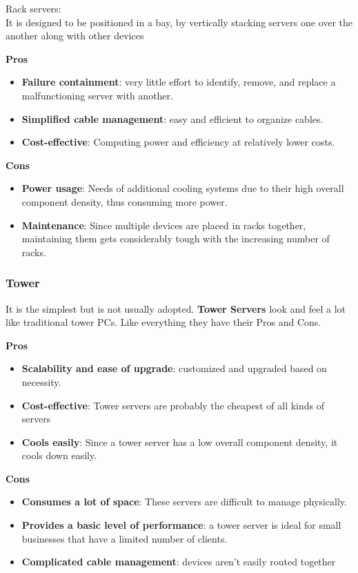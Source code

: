 \documentclass[10pt, oneside]{article}
\begin{document}
Rack servers:\\
It is designed to be positioned in a bay, by vertically stacking servers one over the another along with other devices
\begin{multicols}{2}
\noindent
{\bf \color{green}Pros}\color{black}
\begin{itemize}
    \item {\bf Failure containment}: very little effort to identify, remove, and replace a malfunctioning server with another.
    \item {\bf Simplified cable management}: easy
and efficient to organize cables.
    \item {\bf Cost-effective}: Computing power and efficiency at relatively lower costs.
\end{itemize}
\columnbreak
\noindent
{\bf \color{red}Cons}\color{black}
\begin{itemize}
    \item {\bf Power usage}: Needs of additional cooling systems due to their high overall component density, thus consuming more power.
    \item {\bf Maintenance}: Since multiple devices are placed in racks together, maintaining them gets considerably tough with the increasing number of racks.
\end{itemize}
\end{multicols}
\newpage
\subsubsection{Tower}
It is the simplest but is not usually adopted.
\textbf{Tower Servers}
look and feel a lot like traditional tower PCs.
Like everything they have their Pros and Cons.
\begin{multicols}{2}
\noindent
{\bf \color{green}Pros}\color{black}
\begin{itemize}
    \item {\bf Scalability and ease of upgrade}: customized and upgraded based on necessity.
    \item {\bf Cost-effective}: Tower servers are probably the cheapest of all kinds of servers
    \item {\bf Cools easily}: Since a tower server has a low overall component density, it cools down easily.
\end{itemize}
\columnbreak
\noindent
{\bf \color{red}Cons}\color{black}
\begin{itemize}
    \item {\bf Consumes a lot of space}: These servers are difficult to manage physically.
    \item {\bf Provides a basic level of performance}: a tower server is ideal for small businesses that have a limited number of clients.
    \item {\bf Complicated cable management}: devices aren't easily routed together
\end{itemize}
\end{multicols}
\end{document}
